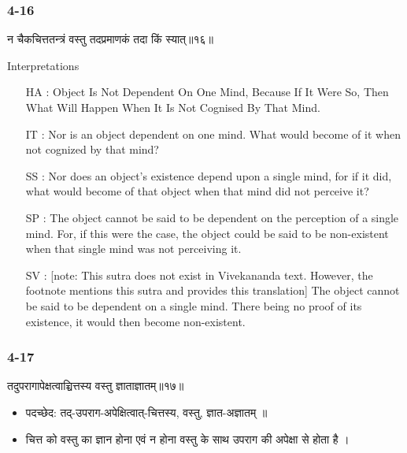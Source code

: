 \begin{frame}[fragile]\frametitle{4-16}
\begin{sanskrit}
न चैकचित्ततन्त्रं वस्तु तदप्रमाणकं तदा किं स्यात्॥१६॥
\end{sanskrit}

Interpretations
\begin{itemize}	
\item [HA]: Object Is Not Dependent On One Mind, Because If It Were So, Then What Will Happen When It Is Not Cognised By That Mind.
\item [IT]: Nor is an object dependent on one mind. What would become of it when not cognized by that mind?
\item [SS]: Nor does an object’s existence depend upon a single mind, for if it did, what would become of that object when that mind did not perceive it?
\item [SP]: The object cannot be said to be dependent on the perception of a single mind. For, if this were the case, the object could be said to be non-existent when that single mind was not perceiving it.
\item [SV]: [note: This sutra does not exist in Vivekananda text. However, the footnote mentions this sutra and provides this translation] The object cannot be said to be dependent on a single mind. There being no proof of its existence, it would then become non-existent. 
\end{itemize}
\end{frame}


\begin{frame}[fragile]\frametitle{4-17}
\begin{sanskrit}
तदुपरागापेक्षत्वाच्चित्तस्य वस्तु ज्ञाताज्ञातम्॥१७॥
\end{sanskrit}

\begin{itemize}
\item पदच्छेद:  तद्-उपराग-अपेक्षित्वात्-चित्तस्य, वस्तु, ज्ञात-अज्ञातम् ॥
\item चित्त को वस्तु का ज्ञान होना एवं न होना वस्तु के साथ उपराग की अपेक्षा से होता है ।
\end{itemize}
\end{frame}



